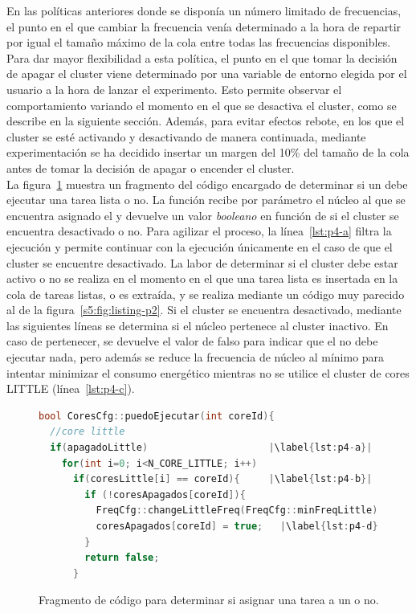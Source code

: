 En las políticas anteriores donde se disponía un número limitado de
frecuencias, el punto en el que cambiar la frecuencia venía determinado a
la hora de repartir por igual el tamaño máximo de la cola entre todas las
frecuencias disponibles. Para dar mayor flexibilidad a esta política, el
punto en el que tomar la decisión de apagar el cluster viene determinado
por una variable de entorno elegida por el usuario a la hora de lanzar el
experimento. Esto permite observar el comportamiento variando el momento en
el que se desactiva el cluster, como se describe en la siguiente
sección. Además, para evitar efectos rebote, en los que el cluster se esté
activando y desactivando de manera continuada, mediante experimentación se
ha decidido insertar un margen del 10\% del tamaño de la cola antes de
tomar la decisión de apagar o encender el cluster.\\

La figura~\ref{fig:P4-puedo-ejecutar} muestra un fragmento del código
encargado de determinar si un \wt debe ejecutar una tarea lista o no. La
función recibe por parámetro el núcleo al que se encuentra asignado el \wt
y devuelve un valor \emph{booleano} en función de si el cluster se
encuentra desactivado o no. Para agilizar el proceso, la
línea~\ref{lst:p4-a} filtra la ejecución y permite continuar con la
ejecución únicamente en el caso de que el cluster se encuentre
desactivado. La labor de determinar si el cluster debe estar activo o no se
realiza en el momento en el que una tarea lista es insertada en la cola de
tareas listas, o es extraída, y se realiza mediante un código muy parecido
al de la figura~\ref{s5:fig:listing-p2}. Si el cluster se encuentra
desactivado, mediante las siguientes líneas se determina si el núcleo
pertenece al cluster inactivo. En caso de pertenecer, se devuelve el
valor de falso para indicar que el \wt no debe ejecutar nada, pero además
se reduce la frecuencia de núcleo al mínimo para intentar minimizar el
consumo energético mientras no se utilice el cluster de cores LITTLE
(línea~\ref{lst:p4-c}).


\begin{figure}
  \centering
\begin{lstlisting}[language=C++]
bool CoresCfg::puedoEjecutar(int coreId){
  //core little
  if(apagadoLittle)                     |\label{lst:p4-a}|
    for(int i=0; i<N_CORE_LITTLE; i++)
      if(coresLittle[i] == coreId){     |\label{lst:p4-b}|
        if (!coresApagados[coreId]){
          FreqCfg::changeLittleFreq(FreqCfg::minFreqLittle); |\label{lst:p4-c}|
          coresApagados[coreId] = true;   |\label{lst:p4-d}|
        }
        return false;
      }
\end{lstlisting}
  \caption{Fragmento de código para determinar si asignar una tarea a un
    \wt o no.}
  \label{fig:P4-puedo-ejecutar}
\end{figure}

